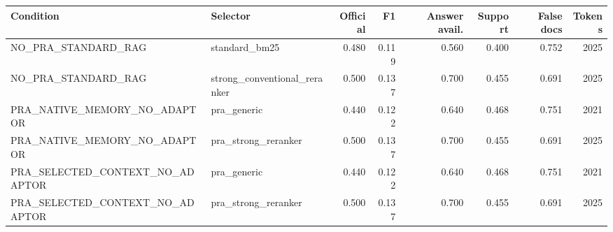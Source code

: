 \begin{tabular}{llrrrrrr}
\toprule
Condition & Selector & Official & F1 & Answer avail. & Support & False docs & Tokens \\
\midrule
NO\_PRA\_STANDARD\_RAG & standard\_bm25 & 0.480 & 0.119 & 0.560 & 0.400 & 0.752 & 2025 \\
NO\_PRA\_STANDARD\_RAG & strong\_conventional\_reranker & 0.500 & 0.137 & 0.700 & 0.455 & 0.691 & 2025 \\
PRA\_NATIVE\_MEMORY\_NO\_ADAPTOR & pra\_generic & 0.440 & 0.122 & 0.640 & 0.468 & 0.751 & 2021 \\
PRA\_NATIVE\_MEMORY\_NO\_ADAPTOR & pra\_strong\_reranker & 0.500 & 0.137 & 0.700 & 0.455 & 0.691 & 2025 \\
PRA\_SELECTED\_CONTEXT\_NO\_ADAPTOR & pra\_generic & 0.440 & 0.122 & 0.640 & 0.468 & 0.751 & 2021 \\
PRA\_SELECTED\_CONTEXT\_NO\_ADAPTOR & pra\_strong\_reranker & 0.500 & 0.137 & 0.700 & 0.455 & 0.691 & 2025 \\
\bottomrule
\end{tabular}
